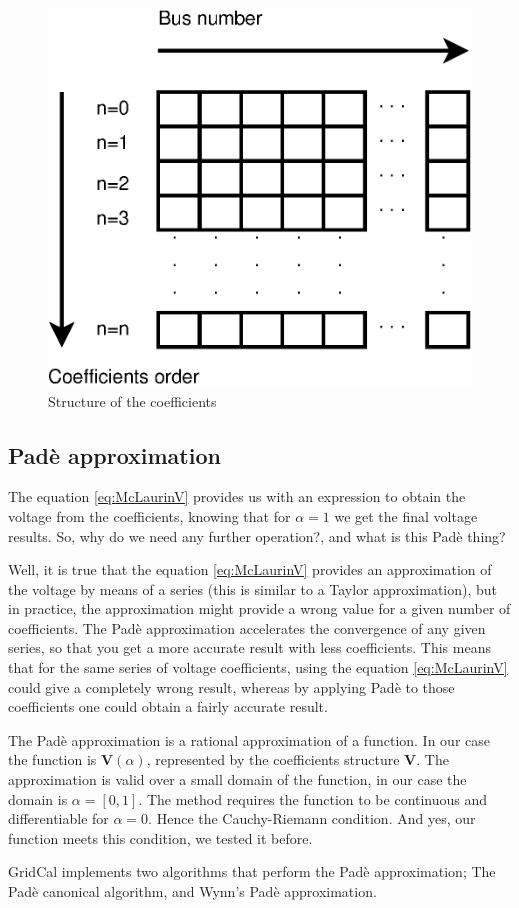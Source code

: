 \documentclass[a4paper,twoside,fleqn]{tufte-book}
\begin{document}
\begin{figure}[h]
	\centering
	\includegraphics[width=0.4\linewidth]{img/CoefficientsStructure.eps}
	\caption{Structure of the coefficients}
	\label{fig:CoefficientsStructure}
\end{figure}

\subsection{Padè approximation}

The equation \ref{eq:McLaurinV} provides us with an expression to obtain the voltage from the coefficients, knowing that for $\alpha=1$ we get the final voltage results. So, why do we need any further operation?, and what is this Padè thing?

Well, it is true that the equation \ref{eq:McLaurinV} provides an approximation of the voltage by means of a series (this is similar to a Taylor approximation), but in practice, the approximation might provide a wrong value for a given number of coefficients. The Padè approximation accelerates the convergence of any given series, so that you get a more accurate result with less coefficients. This means that for the same series of voltage coefficients, using the equation \ref{eq:McLaurinV} could give a completely wrong result, whereas by applying Padè to those coefficients one could obtain a fairly accurate result.

The Padè approximation is a rational approximation of a function. In our case the function is $\textbf{V}(\alpha)$, represented by the coefficients structure $\textbf{V}$. The approximation is valid over a small domain of the function, in our case the domain is $\alpha=[0,1]$. The method requires the function to be continuous and differentiable for $\alpha=0$. Hence the Cauchy-Riemann condition. And yes, our function meets this condition, we tested it before.

GridCal implements two algorithms that perform the Padè approximation; The Padè canonical algorithm, and Wynn's Padè approximation.
\end{document}
